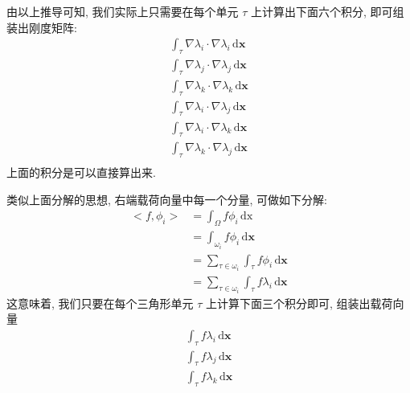 \documentclass{article}
\begin{document}
由以上推导可知, 我们实际上只需要在每个单元 $\tau$ 上计算出下面六个积分, 即可组装出刚度矩阵:
$$
\begin{aligned}
\int_{\tau}\nabla\lambda_i\cdot\nabla\lambda_i\,\mathrm d \mathbf x\\
\int_{\tau}\nabla\lambda_j\cdot\nabla\lambda_j\,\mathrm d \mathbf x\\
\int_{\tau}\nabla\lambda_k\cdot\nabla\lambda_k\,\mathrm d \mathbf x\\
\int_{\tau}\nabla\lambda_i\cdot\nabla\lambda_j\,\mathrm d \mathbf x\\
\int_{\tau}\nabla\lambda_i\cdot\nabla\lambda_k\,\mathrm d \mathbf x\\
\int_{\tau}\nabla\lambda_k\cdot\nabla\lambda_j\,\mathrm d \mathbf x\\
\end{aligned}
$$
上面的积分是可以直接算出来.

类似上面分解的思想, 右端载荷向量中每一个分量, 可做如下分解:
$$
\begin{aligned}
<f,\phi_i> &= \int_{\Omega}f\phi_i\,\mathrm d\mathrm x\\
& = \int_{\omega_i}f\phi_i\,\mathrm d\mathbf x \\
& = \sum_{\tau\in\omega_i}\int_{\tau}f\phi_i\,\mathrm d\mathbf x\\
& = \sum_{\tau\in\omega_i}\int_{\tau}f\lambda_i\,\mathrm d\mathbf x
\end{aligned}
$$
这意味着, 我们只要在每个三角形单元 $\tau$ 上计算下面三个积分即可, 组装出载荷向量
$$
\begin{aligned}
\int_{\tau}f\lambda_i\,\mathrm d\mathbf x\\
\int_{\tau}f\lambda_j\,\mathrm d\mathbf x\\
\int_{\tau}f\lambda_k\,\mathrm d\mathbf x\\
\end{aligned}
$$




























\end{document}
